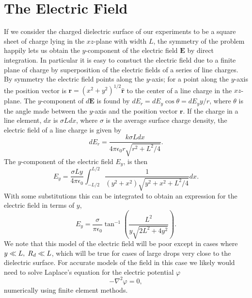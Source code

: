 \documentclass[12pt,a4paper,oneside]{book}
\begin{document}
\section{The Electric Field}
If we consider the charged dielectric surface of our experiments to be a square sheet of charge lying in the $xz$-plane with width $L$, the symmetry of the problem happily lets us obtain the $y$-component of the electric field $\mathbf{E}$ by direct integration. In particular it is easy to constuct the electric field due to a finite plane of charge by superposition of the electric fields of a series of line charges. By symmetry the electric field points along the $y$-axis; for a point along the $y$-axis the position vector is $\mathbf{r} = \left( x^2 + y^2 \right)^{1/2} \hat{\mathbf{r}}$ to the center of a line charge in the $xz$-plane. The $y$-component of $d\mathbf{E}$ is found by $d E_r = d E_y \cos \theta = d E_y y/ r$, where $\theta$ is the angle made between the $y$-axis and the position vector $\mathbf{r}$. If the charge in a line element, $dx$ is $\sigma L dx$, where $\sigma$ is the average surface charge density, the electric field of a line charge is given by \cite{david_j._griffiths_introduction_1999}
\[d E_r = \frac{k \sigma L dx}{4 \pi \epsilon_0 r \sqrt{r^2 + L^2/4}}.
\]
The $y$-component of the electric field $E_y$, is then
\[ E_y = \frac{\sigma L y }{4 \pi \epsilon_0} \int^{L/2}_{-L/2} \frac{1}{(y^2 + x^2) \sqrt{y^2 + x^2 + L^2/4}} dx 
.\]
With some substitutions this can be integrated to obtain an expression for the electric field in terms of $y$, 
\begin{equation}
E_y = \frac{\sigma}{ \pi \epsilon_0} \tan^{-1} \left( \frac{L^2}{y \sqrt{2L^2 + 4y^2}}\right)
.\end{equation}
We note that this model of the electric field will be poor except in cases where $y \ll L, \hspace{1 mm} R_d \ll L$, which will be true for cases of large drops very close to the dielectric surface. For accurate models of the field in this case we likely would need to solve Laplace's equation for the electric potential $\varphi$
\[ - \nabla^2 \varphi = 0,\]
numerically using finite element methods.
\end{document}
